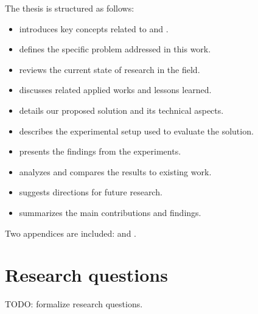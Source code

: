 The thesis is structured as follows:

\begin{itemize}
    \item {} introduces key concepts related to  and .
    \item {} defines the specific problem addressed in this work.
    \item {} reviews the current state of research in the field.
    \item {} discusses related applied works and lessons learned.
    \item {} details our proposed solution and its technical aspects.
    \item {} describes the experimental setup used to evaluate the solution.
    \item {} presents the findings from the experiments.
    \item {} analyzes and compares the results to existing work.
    \item {} suggests directions for future research.
    \item {} summarizes the main contributions and findings.
\end{itemize}

Two appendices are included:  and .

\section{Research questions}

TODO: formalize research questions.